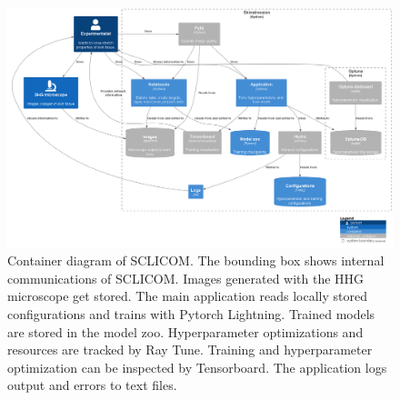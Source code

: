 \begin{figure}
    \centering
    \includegraphics[angle=90, width=0.9\textheight,height=\linewidth,keepaspectratio]{images/Container-diagram.png}
    \caption[SCLICOM container diagram]{
        Container diagram of SCLICOM.
        The bounding box shows internal communications of SCLICOM.
        Images generated with the HHG microscope get stored.
        The main application reads locally stored configurations and trains with Pytorch Lightning.
        Trained models are stored in the model zoo.
        Hyperparameter optimizations and resources are tracked by Ray Tune.
        Training and hyperparameter optimization can be inspected by Tensorboard.
        The application logs output and errors to text files.
    }
    \label{fig:container_diagram}

\end{figure}
